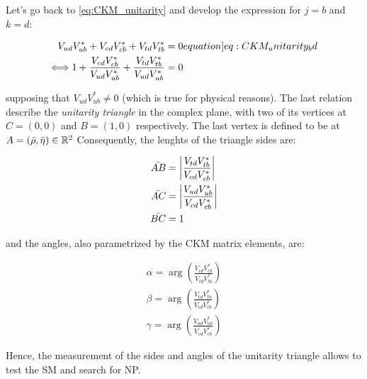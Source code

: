 Let's go back to \cref{eq:CKM_unitarity} and develop the expression for $j = b$ and $k = d$:

\begin{align} 
    V_{ud}V_{ub}^* + V_{cd}V_{cb}^* + V_{td}V_{tb}^* &= 0 \label[equation]{eq:CKM_unitarity_bd} \\
    \Longleftrightarrow 1 + \frac{V_{cd}V_{cb}^*}{V_{ud}V_{ub}^*} + \frac{V_{td}V_{tb}^*}{V_{ud}V_{ub}^*} &= 0
\end{align}

supposing that $V_{ud}V_{ub}^* \neq 0$ (which is true for physical reasons).
The last relation describe the \textit{unitarity triangle} in the complex plane, with two of its vertices at $C = (0, 0)$ and $B = (1, 0)$ respectively.
The last vertex is defined to be at $A = (\Bar{\rho}, \Bar{\eta}) \in \mathbb{R}^2$
Consequently, the lenghts of the triangle sides are:

\begin{align}
    \Bar{AB} &= \abs{\frac{V_{td}V_{tb}^*}{V_{cd}V_{cb}^*}} \\
    \Bar{AC} &= \abs{\frac{V_{ud}V_{ub}^*}{V_{cd}V_{cb}^*}} \\
    \Bar{BC} &= 1
\end{align}

and the angles, also parametrized by the \gls{CKM} matrix elements, are:

\begin{align}
    \alpha = \arg\left(\frac{V_{cd}V_{cb}^*}{V_{td}V_{tb}^*}\right) \\
    \beta =  \arg\left(\frac{V_{td}V_{tb}^*}{V_{cd}V_{cb}^*}\right) \\
    \gamma = \arg\left(\frac{V_{ud}V_{ub}^*}{V_{cd}V_{cb}^*}\right)
\end{align}

Hence, the measurement of the sides and angles of the unitarity triangle allows to test the \gls{SM} and search for \gls{NP}.
